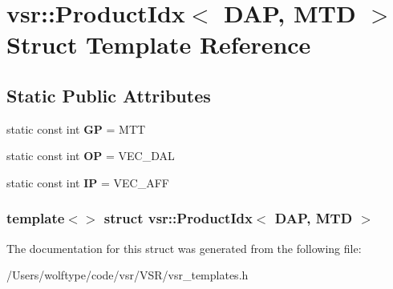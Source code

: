 \hypertarget{structvsr_1_1_product_idx_3_01_d_a_p_00_01_m_t_d_01_4}{\section{vsr\-:\-:Product\-Idx$<$ D\-A\-P, M\-T\-D $>$ Struct Template Reference}
\label{structvsr_1_1_product_idx_3_01_d_a_p_00_01_m_t_d_01_4}
}
\subsection*{Static Public Attributes}
\begin{DoxyCompactItemize}
\item 
\hypertarget{structvsr_1_1_product_idx_3_01_d_a_p_00_01_m_t_d_01_4_aff93e7097cd3f43a6f7f6e3bc6d50a1a}{static const int {\bfseries G\-P} = M\-T\-T}\label{structvsr_1_1_product_idx_3_01_d_a_p_00_01_m_t_d_01_4_aff93e7097cd3f43a6f7f6e3bc6d50a1a}

\item 
\hypertarget{structvsr_1_1_product_idx_3_01_d_a_p_00_01_m_t_d_01_4_a5dfe14d508064ce0202c64c18dc0acd5}{static const int {\bfseries O\-P} = V\-E\-C\-\_\-\-D\-A\-L}\label{structvsr_1_1_product_idx_3_01_d_a_p_00_01_m_t_d_01_4_a5dfe14d508064ce0202c64c18dc0acd5}

\item 
\hypertarget{structvsr_1_1_product_idx_3_01_d_a_p_00_01_m_t_d_01_4_a89bc1945eb551f76bc8c5d2448534b58}{static const int {\bfseries I\-P} = V\-E\-C\-\_\-\-A\-F\-F}\label{structvsr_1_1_product_idx_3_01_d_a_p_00_01_m_t_d_01_4_a89bc1945eb551f76bc8c5d2448534b58}

\end{DoxyCompactItemize}
\subsubsection*{template$<$$>$ struct vsr\-::\-Product\-Idx$<$ D\-A\-P, M\-T\-D $>$}



The documentation for this struct was generated from the following file\-:\begin{DoxyCompactItemize}
\item 
/\-Users/wolftype/code/vsr/\-V\-S\-R/vsr\-\_\-templates.\-h\end{DoxyCompactItemize}
